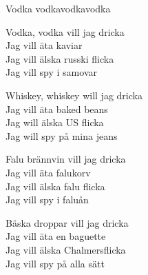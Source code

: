 \begin{song}{Vodka vodka}{vodkavodka}
\begin{vers}
Vodka, vodka vill jag dricka\\
Jag vill äta kaviar\\
\repopen Jag vill älska russki flicka\\
Jag vill spy i samovar \repclose\\
\end{vers}
\begin{vers}
Whiskey, whiskey will jag dricka\\
Jag vill äta baked beans\\
\repopen Jag will älska US flicka\\
Jag will spy på mina jeans \repclose\\
\end{vers}
\begin{vers}
Falu brännvin vill jag dricka\\
Jag vill äta falukorv\\
\repopen Jag vill älska falu flicka\\
Jag vill spy i faluån \repclose\\
\end{vers}
\begin{vers}
Bäska droppar vill jag dricka\\
Jag vill äta en baguette\\
\repopen Jag vill älska Chalmersflicka\\
Jag vill spy på alla sätt \repclose\\
\end{vers}
\end{song}
